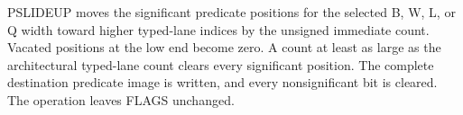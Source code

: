 PSLIDEUP moves the significant predicate positions for the selected B, W, L, or Q width toward higher typed-lane indices by the unsigned immediate count.
Vacated positions at the low end become zero.
A count at least as large as the architectural typed-lane count clears every significant position.
The complete destination predicate image is written, and every nonsignificant bit is cleared.
The operation leaves FLAGS unchanged.
